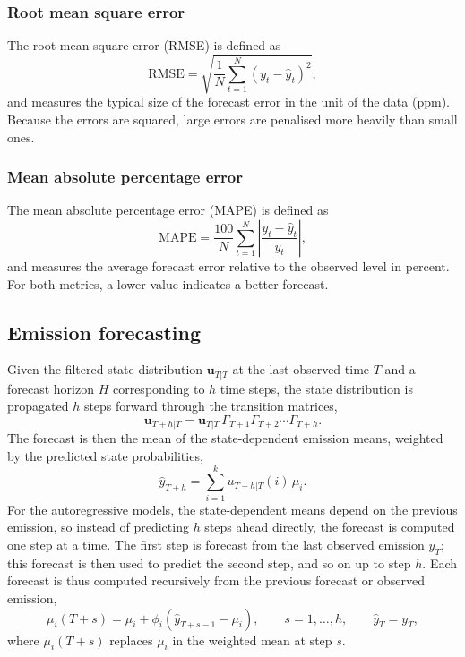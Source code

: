 \subsubsection{Root mean square error}
The root mean square error (RMSE) is defined as
\begin{equation}
    \mathrm{RMSE} = \sqrt{\frac{1}{N} \sum_{t=1}^{N} \left( y_t - \hat{y}_t \right)^2 },
\end{equation}
and measures the typical size of the forecast error in the unit of the data (ppm). Because the
errors are squared, large errors are penalised more heavily than small ones.

\subsubsection{Mean absolute percentage error}
The mean absolute percentage error (MAPE) is defined as
\begin{equation}
    \mathrm{MAPE} = \frac{100}{N} \sum_{t=1}^{N} \left| \frac{y_t - \hat{y}_t}{y_t} \right|,
\end{equation}
and measures the average forecast error relative to the observed level in percent.
For both metrics, a lower value indicates a better forecast.

\subsection{Emission forecasting}
Given the filtered state distribution $\mathbf{u}_{T|T}$ at the last observed time $T$ and a
forecast horizon $H$ corresponding to $h$ time steps, the state distribution is propagated
$h$ steps forward through the transition matrices,
\begin{equation}
    \mathbf{u}_{T+h|T} = \mathbf{u}_{T|T}\, \Gamma_{T+1} \Gamma_{T+2} \cdots \Gamma_{T+h}.
\end{equation}
The forecast is then the mean of the state-dependent emission means, weighted by the
predicted state probabilities,
\begin{equation}
    \hat{y}_{T+h} = \sum_{i=1}^{k} u_{T+h|T}(i)\, \mu_i.
\end{equation}
For the autoregressive models, the state-dependent means depend on the previous emission,
so instead of predicting $h$ steps ahead directly, the forecast is computed one step at a time.
The first step is forecast from the last observed emission $y_T$; this forecast is then used to
predict the second step, and so on up to step $h$. Each forecast is thus computed recursively
from the previous forecast or observed emission,
\begin{equation}
    \mu_i(T+s) = \mu_i + \phi_i \left( \hat{y}_{T+s-1} - \mu_i \right), \qquad s = 1, \dots, h, \qquad \hat{y}_T = y_T,
\end{equation}
where $\mu_i(T+s)$ replaces $\mu_i$ in the weighted mean at step $s$.

